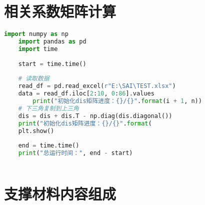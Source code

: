 \documentclass[withoutpreface,bwprint]{cumcmthesis} %
\begin{document}
\newpage
\begin{appendices}

\section{相关系数矩阵计算}

\begin{lstlisting}[language=python]
    import numpy as np
    import pandas as pd
    import time
    
    start = time.time()
    
    # 读取数据
    read_df = pd.read_excel(r"E:\SAI\TEST.xlsx")
    data = read_df.iloc[2:10, 0:86].values
        print("初始化dis矩阵进度：{}/{}".format(i + 1, n))
    # 下三角复制到上三角
    dis = dis + dis.T - np.diag(dis.diagonal())
    print("初始化dis矩阵进度：{}/{}".format(
    plt.show()
    
    end = time.time()
    print("总运行时间：", end - start)
    
\end{lstlisting}

\section{支撑材料内容组成}


\end{appendices}
\end{document}
